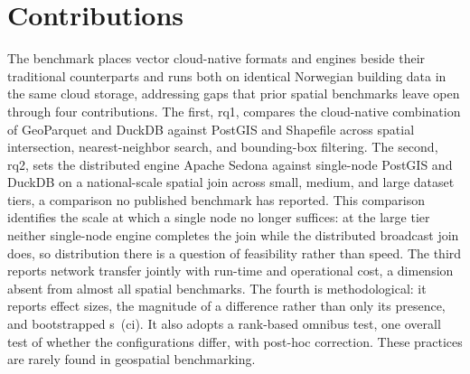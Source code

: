 \section{Contributions}
\label{introduction:contributions}

The benchmark places vector cloud-native formats and engines beside their traditional counterparts and runs both on identical Norwegian building data in the same cloud storage, addressing gaps that prior spatial benchmarks leave open through four contributions. The first, \acrshort{rq}1, compares the cloud-native combination of GeoParquet and DuckDB against PostGIS and Shapefile across spatial intersection, nearest-neighbor search, and bounding-box filtering. The second, \acrshort{rq}2, sets the distributed engine Apache Sedona against single-node PostGIS and DuckDB on a national-scale spatial join across small, medium, and large dataset tiers, a comparison no published benchmark has reported. This comparison identifies the scale at which a single node no longer suffices: at the large tier neither single-node engine completes the join while the distributed broadcast join does, so distribution there is a question of feasibility rather than speed. The third reports network transfer jointly with run-time and operational cost, a dimension absent from almost all spatial benchmarks. The fourth is methodological: it reports effect sizes, the magnitude of a difference rather than only its presence, and bootstrapped s~(\acrshort{ci}). It also adopts a rank-based omnibus test, one overall test of whether the configurations differ, with post-hoc correction. These practices are rarely found in geospatial benchmarking.